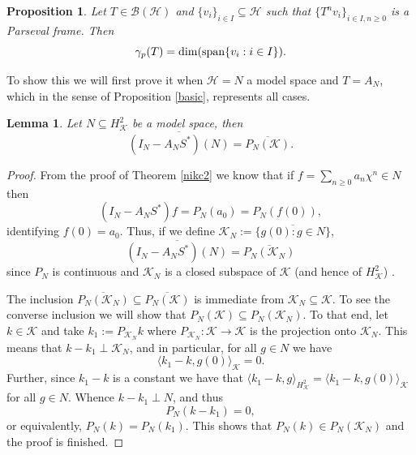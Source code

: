 \documentclass[a4paper,12pt]{amsart}
\def\cB{{\mathcal{B}}}
\def\HH{{\mathcal{H}}}
\def\KK{{\mathcal{K}}}
\newcommand{\scal}[1]{{\langle{#1}\rangle}}
\newtheorem{lemma}[theorem]{Lemma}
\newtheorem{proposition}[theorem]{Proposition}
\theoremstyle{definition}
\begin{document}
\begin{proposition}\label{span}
Let $T\in\cB(\HH)$ and $\{v_i\}_{i\in I}\subseteq\HH$ such that $\{T^nv_i\}_{i\in I,n\geqslant0}$ is a Parseval frame. Then
\begin{equation*}
\gamma_p(T)=\dim ({\rm span}\{v_i:i\in I\} ).
\end{equation*}
\end{proposition}

To show this we will first prove it when $\HH=N$ a model space and $T=A_N$, which in the sense of Proposition \ref{basic}, represents all cases.

\begin{lemma}
Let $N\subseteq H^2_\KK$ be a model space, then
\begin{equation*}
\overline{(I_N-A_NS^*)(N)}=\overline{P_N(\KK)}.
\end{equation*}
\end{lemma}
\begin{proof}
From the proof of Theorem \ref{nikc2} we know that if $f=\sum_{n\geqslant0}a_n\chi^n\in N$ then
\begin{equation*}
(I_N-A_NS^*)f=P_N(a_0)=P_N(f(0)),
\end{equation*}
identifying $f(0)=a_0$. Thus, if we define $\KK_N:=\overline{\{g(0):g\in N\}}$, 
\begin{equation*}
\overline{(I_N-A_NS^*)(N)}=\overline{P_N(\KK_N)}
\end{equation*}
since $P_N$ is continuous and $\KK_N$ is a closed subspace of $\KK$ (and hence of $H^2_\KK$) .

The inclusion $\overline{P_N(\KK_N)}\subseteq\overline{P_N(\KK)}$ is immediate from $\KK_N\subseteq\KK$. To see the converse inclusion we will show that $P_N(\KK)\subseteq P_N(\KK_N)$. To that end, let $k\in\KK$ and take $k_1:=P_{\KK_N}k$ where $P_{\KK_N}:\KK\to\KK$ is the projection onto $\KK_N$. This means that $k-k_1\perp\KK_N$, and in particular, for all $g\in N$ we have
\begin{equation*}
\scal{k_1-k,g(0)}_\KK=0.
\end{equation*}
Further, since $k_1-k$ is a constant we have that $\scal{k_1-k,g}_{H^2_\KK}=\scal{k_1-k,g(0)}_\KK$ for all $g\in N$. Whence $k-k_1\perp N$, and thus
\begin{equation*}
P_N(k-k_1)=0,
\end{equation*}
or equivalently, $P_N(k)=P_N(k_1)$. This shows that $P_N(k)\in P_N(\KK_N)$ and the proof is finished.
\end{proof}
\end{document}

